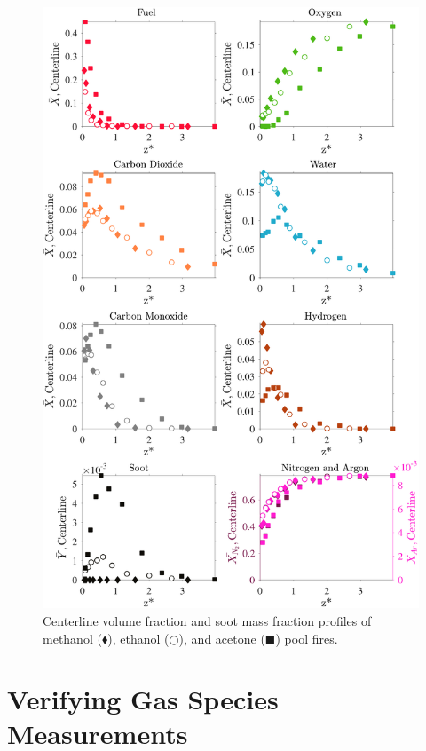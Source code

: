 \documentclass[12pt]{article}
\begin{document}
\begin{figure}[!]
	\centering
\includegraphics[width=12.5cm,keepaspectratio]{OVERALL_Fuel_Comparison.pdf}
	\caption[Centerline volume fraction and soot mass fraction profiles]{Centerline volume fraction and soot mass fraction profiles of methanol ($\blacklozenge$), ethanol ($\bigcirc$), and acetone ($\blacksquare$) pool fires.}
	\label{fig:Fuel_Comparison}
\end{figure}


\clearpage

\section{Verifying Gas Species Measurements}
\label{ssec:Verifying_Vol_Frac_Measurements}
\end{document}
